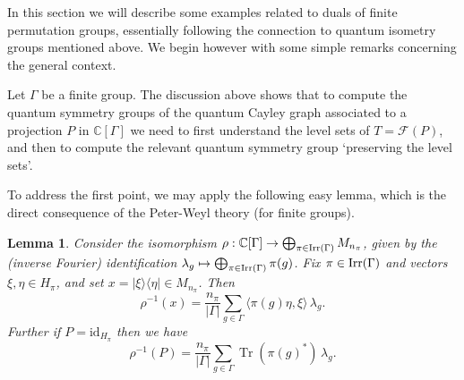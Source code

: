 \documentclass[12pt]{amsart}
\newtheorem{lem}[thm]{Lemma}
\theoremstyle{definition}
\theoremstyle{definition}
\theoremstyle{definition}
\theoremstyle{definition}
\DeclareMathOperator{\Tr}{Tr}
\newcommand{\id}{\mathrm{id}}
\newcommand{\C}{\mathbb{C}}
\numberwithin{equation}{section}
\begin{document}
In this section we will describe some examples related to duals of finite permutation groups, essentially following the connection to quantum isometry groups mentioned above. We begin however with some simple remarks concerning the general context.


Let $\Gamma$ be a finite group. The discussion above shows that to compute the quantum symmetry groups of the quantum Cayley graph associated to a projection $P$ in $\C[\Gamma]$ we need to first understand the level sets of $T=\mathcal F(P)$, and then to compute the relevant quantum symmetry group `preserving the level sets'. 

To address the first point, we may apply the following easy lemma, which is the direct consequence of the Peter-Weyl theory (for finite groups).

\begin{lem} \label{PeterWeyl}
Consider the  isomorphism $\rho:\C[\Gamma]\to \bigoplus_{\pi \in \textup{Irr}(\Gamma)} M_{n_{\pi}}$, given by the (inverse Fourier) identification $\lambda_g \mapsto \bigoplus_{\pi \in \textup{Irr}(\Gamma)} \pi(g)$. Fix $\pi \in \textup{Irr}(\Gamma)$ and vectors $\xi,\eta \in H_\pi$, and set $x=|\xi\rangle \langle \eta | \in M_{n_{\pi}}$. Then 
\[ \rho^{-1} (x) = \frac{ n_\pi}{|\Gamma|}\sum_{g\in \Gamma}
\langle \pi(g) \eta,  \xi \rangle\,\lambda_g.\]
Further if $P=\id_{H_\pi}$ then we have
\[ \rho^{-1} (P) = \frac{ n_\pi}{|\Gamma|}\sum_{g\in \Gamma} \Tr(\pi(g)^*) \, \lambda_g.\] 
\end{lem}
\end{document}
